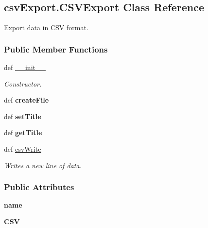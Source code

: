 \hypertarget{classcsv_export_1_1_c_s_v_export}{\subsection{csv\-Export.\-C\-S\-V\-Export Class Reference}
\label{classcsv_export_1_1_c_s_v_export}
}


Export data in C\-S\-V format.  


\subsubsection*{Public Member Functions}
\begin{DoxyCompactItemize}
\item 
def \hyperlink{classcsv_export_1_1_c_s_v_export_ac878a5b6f1169cc205547656c00e64d5}{\-\_\-\-\_\-init\-\_\-\-\_\-}
\begin{DoxyCompactList}\small\item\em Constructor. \end{DoxyCompactList}\item 
\hypertarget{classcsv_export_1_1_c_s_v_export_a605059a6afb9a35e9ebbc80ae632d015}{def {\bfseries create\-File}}\label{classcsv_export_1_1_c_s_v_export_a605059a6afb9a35e9ebbc80ae632d015}

\item 
\hypertarget{classcsv_export_1_1_c_s_v_export_a56b678cc6a9b35df8ff37457d35d54b5}{def {\bfseries set\-Title}}\label{classcsv_export_1_1_c_s_v_export_a56b678cc6a9b35df8ff37457d35d54b5}

\item 
\hypertarget{classcsv_export_1_1_c_s_v_export_a143befa997663d79b5e748682dceaa89}{def {\bfseries get\-Title}}\label{classcsv_export_1_1_c_s_v_export_a143befa997663d79b5e748682dceaa89}

\item 
def \hyperlink{classcsv_export_1_1_c_s_v_export_a5b5e890619df75ddc137184f59036d09}{csv\-Write}
\begin{DoxyCompactList}\small\item\em Writes a new line of data. \end{DoxyCompactList}\end{DoxyCompactItemize}
\subsubsection*{Public Attributes}
\begin{DoxyCompactItemize}
\item 
\hypertarget{classcsv_export_1_1_c_s_v_export_a47426fc9f59aa78fa2ca721d71a5deec}{{\bfseries name}}\label{classcsv_export_1_1_c_s_v_export_a47426fc9f59aa78fa2ca721d71a5deec}

\item 
\hypertarget{classcsv_export_1_1_c_s_v_export_ae6d8f4d693e9421b2e317def0815719e}{{\bfseries C\-S\-V}}\label{classcsv_export_1_1_c_s_v_export_ae6d8f4d693e9421b2e317def0815719e}

\end{DoxyCompactItemize}


